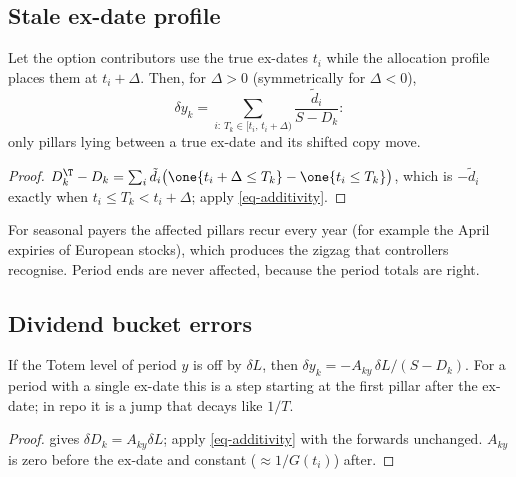 \subsection{Stale ex-date profile}
\begin{proposition}\label{prop-profile}
Let the option contributors use the true ex-dates $t_i$ while the allocation profile places them at $t_i+\Delta$.
Then, for $\Delta>0$ (symmetrically for $\Delta<0$),
\[
\delta y_k=\sum_{i:\,T_k\in[t_i,\,t_i+\Delta)}\frac{\tilde d_i}{S-D_k}:
\]
only pillars lying between a true ex-date and its shifted copy move.
\end{proposition}
\begin{proof}
$D^\T_k-D_k=\sum_i\tilde d_i\bigl(\one\{t_i+\Delta\le T_k\}-\one\{t_i\le T_k\}\bigr)$, which is $-\tilde d_i$ exactly
when $t_i\le T_k<t_i+\Delta$; apply \cref{eq-additivity}.
\end{proof}
For seasonal payers the affected pillars recur every year (for example the April expiries of European stocks), which
produces the zigzag that controllers recognise. Period ends are never affected, because the period totals are right.

\subsection{Dividend bucket errors}
\begin{proposition}\label{prop-bucket}
If the Totem level of period $y$ is off by $\delta L$, then $\delta y_k=-A_{ky}\,\delta L/(S-D_k)$. For a period with
a single ex-date this is a step starting at the first pillar after the ex-date; in repo it is a jump that decays like
$1/T$.
\end{proposition}
\begin{proof}
 gives $\delta D_k=A_{ky}\delta L$; apply \cref{eq-additivity} with the forwards unchanged.
$A_{ky}$ is zero before the ex-date and constant ($\approx1/G(t_i)$) after.
\end{proof}

